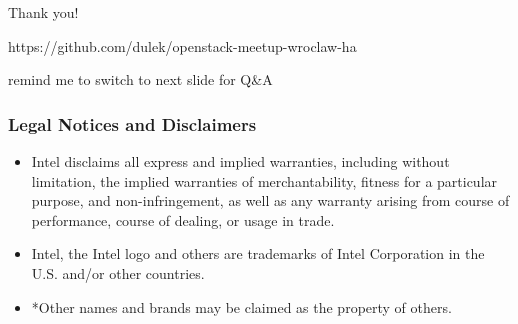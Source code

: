 \documentclass[aspectratio=169]{beamer}
\begin{document}
\begin{frame}
    \begin{center}
        \huge Thank you!

        \vfill

        \Large https://github.com/dulek/openstack-meetup-wroclaw-ha

        \vfill

        \small remind me to switch to next slide for Q\&A
    \end{center}
\end{frame}

\begin{frame}
    \frametitle{Legal Notices and Disclaimers}
    \begin{itemize}
\item Intel disclaims all express and implied warranties, including without
limitation, the implied warranties of merchantability, fitness for a particular
purpose, and non-infringement, as well as any warranty arising from course of
performance, course of dealing, or usage in trade.

\item Intel, the Intel logo and others are trademarks of Intel Corporation in the 
U.S. and/or other countries.

\item *Other names and brands may be claimed as the property of others.
    \end{itemize}
\end{frame}
\end{document}
